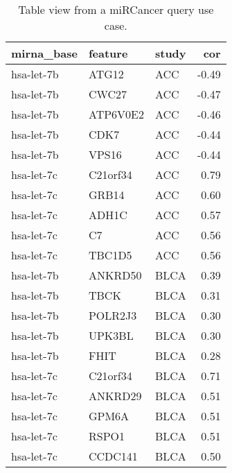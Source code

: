 \begin{table}[ht]
\centering
\begin{tabular}{lllr}
  \hline
mirna\_base & feature & study & cor \\ 
  \hline
hsa-let-7b & ATG12 & ACC & -0.49 \\ 
  hsa-let-7b & CWC27 & ACC & -0.47 \\ 
  hsa-let-7b & ATP6V0E2 & ACC & -0.46 \\ 
  hsa-let-7b & CDK7 & ACC & -0.44 \\ 
  hsa-let-7b & VPS16 & ACC & -0.44 \\ 
  hsa-let-7c & C21orf34 & ACC & 0.79 \\ 
  hsa-let-7c & GRB14 & ACC & 0.60 \\ 
  hsa-let-7c & ADH1C & ACC & 0.57 \\ 
  hsa-let-7c & C7 & ACC & 0.56 \\ 
  hsa-let-7c & TBC1D5 & ACC & 0.56 \\ 
  hsa-let-7b & ANKRD50 & BLCA & 0.39 \\ 
  hsa-let-7b & TBCK & BLCA & 0.31 \\ 
  hsa-let-7b & POLR2J3 & BLCA & 0.30 \\ 
  hsa-let-7b & UPK3BL & BLCA & 0.30 \\ 
  hsa-let-7b & FHIT & BLCA & 0.28 \\ 
  hsa-let-7c & C21orf34 & BLCA & 0.71 \\ 
  hsa-let-7c & ANKRD29 & BLCA & 0.51 \\ 
  hsa-let-7c & GPM6A & BLCA & 0.51 \\ 
  hsa-let-7c & RSPO1 & BLCA & 0.51 \\ 
  hsa-let-7c & CCDC141 & BLCA & 0.50 \\ 
   \hline
\end{tabular}
\caption{Table view from a miRCancer query use case.} 
\label{table2}
\end{table}
